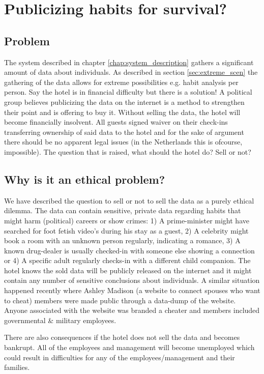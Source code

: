 \chapter{Publicizing habits for survival?}

\section{Problem}
The system described in chapter \ref{chap:system_description} gathers a significant amount of data about individuals. As described in section \ref{sec:extreme_scen} the gathering of the data allows for extreme possibilities e.g. habit analysis per person. Say the hotel is in financial difficulty but there is a solution! A political group believes publicizing the data on the internet is a method to strengthen their point and is offering to buy it. Without selling the data, the hotel will become financially insolvent. All guests signed waiver on their check-ins transferring ownership of said data to the hotel and for the sake of argument there should be no apparent legal issues (in the Netherlands this is ofcourse, impossible). The question that is raised, what should the hotel do? Sell or not?


\section{Why is it an ethical problem?}
We have described the question to sell or not to sell the data as a purely ethical dilemma. The data can contain sensitive, private data regarding habits that might harm (political) careers or show crimes: 1) A prime-minister might have searched for foot fetish video's during his stay as a guest, 2) A celebrity might book a room with an unknown person regularly, indicating a romance, 3) A known drug-dealer is usually checked-in with someone else showing a connection or 4) A specific adult regularly checks-in with a different child companion. The hotel knows the sold data will be publicly released on the internet and it might contain any number of sensitive conclusions about individuals. A similar situation happened recently where Ashley Madison (a website to connect spouses who want to cheat) members were made public through a data-dump of the website. Anyone associated with the website was branded a cheater and members included governmental \& military employees.

There are also consequences if the hotel does not sell the data and becomes bankrupt. All of the employees and management will become unemployed which could result in difficulties for any of the employees/management and their families. 

